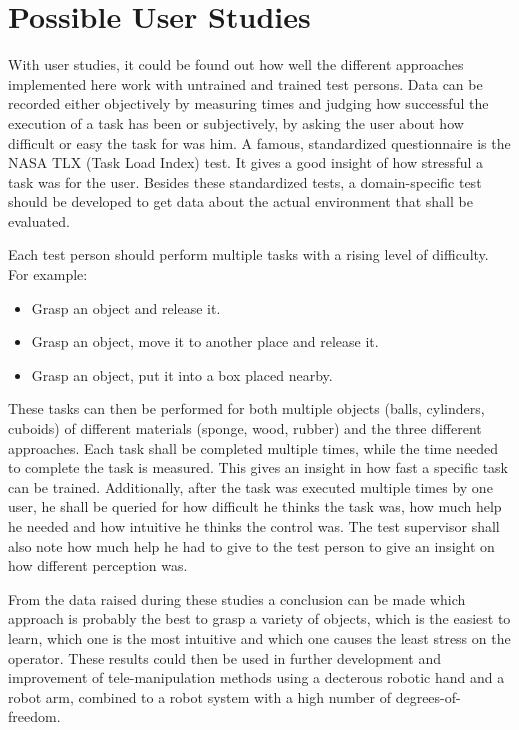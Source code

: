 \section{Possible User Studies}

With user studies, it could be found out how well the different approaches implemented here work with untrained and trained test persons. Data can be recorded either objectively by measuring times and judging how successful the execution of a task has been or subjectively, by asking the user about how difficult or easy the task for was him. A famous, standardized questionnaire is the NASA TLX (Task Load Index) test\cite{Hart1988}. It gives a good insight of how stressful a task was for the user. Besides these standardized tests, a domain-specific test should be developed to get data about the actual environment that shall be evaluated.

Each test person should perform multiple tasks with a rising level of difficulty. For example:
\begin{itemize}
	\item Grasp an object and release it.
	\item Grasp an object, move it to another place and release it.
	\item Grasp an object, put it into a box placed nearby.
\end{itemize}
These tasks can then be performed for both multiple objects (balls, cylinders, cuboids) of different materials (sponge, wood, rubber) and the three different approaches. Each task shall be completed multiple times, while the time needed to complete the task is measured. This gives an insight in how fast a specific task can be trained. Additionally, after the task was executed multiple times by one user, he shall be queried for how difficult he thinks the task was, how much help he needed and how intuitive he thinks the control was. The test supervisor shall also note how much help he had to give to the test person to give an insight on how different perception was. 

From the data raised during these studies a conclusion can be made which approach is probably the best to grasp a variety of objects, which is the easiest to learn, which one is the most intuitive and which one causes the least stress on the operator. These results could then be used in further development and improvement of tele-manipulation methods using a decterous robotic hand and a robot arm, combined to a robot system with a high number of degrees-of-freedom.